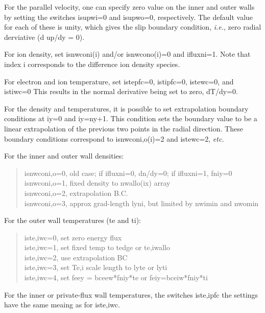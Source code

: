 \documentclass [12pt]{article}
\begin{document}
For the parallel velocity, one can specify zero value on the inner and outer
walls by setting the switches {\sf isupwi=0} and {\sf isupwo=0}, respectively.
The default value for each of these is unity, which gives the slip boundary
condition, {\it i.e.}, zero radial derviative (d up/dy = 0).


For ion density, set {\sf isnwconi(i)} and/or {\sf isnwcono(i)}=0 and {\sf
  ifluxni}=1. Note that index {\sf i} corresponds to the difference ion
density species.

For electron and ion temperature, set {\sf istepf}c=0, {\sf istipfc}=0, {\sf
  istew}c=0, and {\sf istiwc}=0 This results in the normal derivative being
set to zero, dT/dy=0.



For the density and temperatures, it is possible to set extrapolation boundary
conditions at iy=0 and iy=ny+1. This condition sets the boundary value to be a
linear extrapolation of the previous two points in the radial direction. These
boundary conditions correspond to {\sf isnwconi,o(i)}=2 and {\sf istewc}=2,
{\it etc.}


For the inner and outer wall densities:
\begin{verse} \sf
  isnwconi,o=0, old case; if ifluxni=0, dn/dy=0; if ifluxni=1, fniy=0 \\
  isnwconi,o=1, fixed density to nwallo(ix) array\\
  isnwconi,o=2, extrapolation B.C.\\
  isnwconi,o=3, approx grad-length lyni, but limited by nwimin and nwomin
\end{verse}

For the outer wall temperatures (te and ti):
\begin{verse} \sf
  iste,iwc=0, set zero energy flux\\
  iste,iwc=1, set fixed temp to tedge or te,iwallo\\
  iste,iwc=2, use extrapolation BC\\
  iste,iwc=3, set Te,i scale length to lyte or lyti\\
  iste,iwc=4, set feey = bceew*fniy*te or feiy=bceiw*fniy*ti\\
\end{verse}
For the inner or private-flux wall temperatures, the switches {\sf iste,ipfc}
the settings have the same meaing as for {\sf iste,iwc}.
\end{document}
